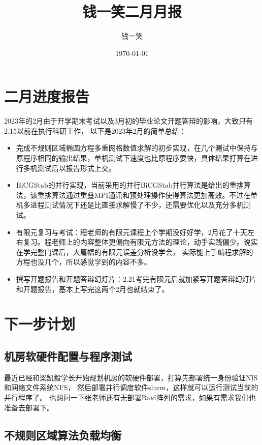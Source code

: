 \documentclass[bibend=bibtex,lang=cn]{elegantpaper}
\title{钱一笑二月月报}
\author{钱一笑}
\date{\today}
\institute{浙江大学}
\theoremstyle{plain}
\begin{document}
\maketitle

\section{二月进度报告}

2023年的2月由于开学期末考试以及3月初的毕业论文开题答辩的影响，大致只有2.15以前在执行科研工作，
以下是2023年2月的简单总结：

\begin{itemize}
\item 完成不规则区域椭圆方程多重网格数值求解的初步实现，在几个测试中保持与原程序相同的输出结果，单机测试下速度也比原程序要快，具体结果打算在进行多机测试后以报告形式上交。
\item BiCGStab的并行实现，当前采用的并行BiCGStab并行算法是\cite{krasnopolsky2010reordered}给出的重排算法，该重排算法通过重叠MPI通讯和预处理操作使得算法更加高效。不过在单机多进程测试情况下还是比直接求解慢了不少，还需要优化以及充分多机测试。
\item 有限元复习与考试：程老师的有限元课程上个学期没好好学，2月花了十天左右复习。程老师上的内容整体更偏向有限元方法的理论，动手实践偏少。说实在学完整门课后，大篇幅的有限元误差分析没学会，
  实际能上手编程求解的方程也没几个，所以感觉学到的内容不多。
\item 撰写开题报告和开题答辩幻灯片：2.21考完有限元后就加紧写开题答辩幻灯片和开题报告，基本上写完这两个2月也就结束了。
\end{itemize}

\section{下一步计划}

\subsection{机房软硬件配置与程序测试}

最近已经和梁凯毅学长开始规划机房的软硬件部署，打算先部署统一身份验证NIS和网络文件系统NFS，
然后部署并行调度软件slurm，这样就可以运行测试当前的并行程序了。
也想问一下张老师还有无部署Raid阵列的需求，如果有需求我们也准备去部署下。

\subsection{不规则区域算法负载均衡}
\end{document}
